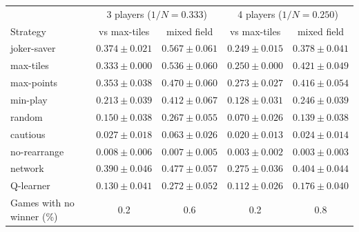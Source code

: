 \begin{tabular}{@{}lcccc@{}}\toprule
 & \multicolumn{2}{c}{3 players ($1/N=0.333$)} & \multicolumn{2}{c}{4 players ($1/N=0.250$)}\\
Strategy & vs max-tiles & mixed field & vs max-tiles & mixed field\\\midrule
joker-saver & $0.374\pm0.021$ & $0.567\pm0.061$ & $0.249\pm0.015$ & $0.378\pm0.041$ \\
max-tiles & $0.333\pm0.000$ & $0.536\pm0.060$ & $0.250\pm0.000$ & $0.421\pm0.049$ \\
max-points & $0.353\pm0.038$ & $0.470\pm0.060$ & $0.273\pm0.027$ & $0.416\pm0.054$ \\
min-play & $0.213\pm0.039$ & $0.412\pm0.067$ & $0.128\pm0.031$ & $0.246\pm0.039$ \\
random & $0.150\pm0.038$ & $0.267\pm0.055$ & $0.070\pm0.026$ & $0.139\pm0.038$ \\
cautious & $0.027\pm0.018$ & $0.063\pm0.026$ & $0.020\pm0.013$ & $0.024\pm0.014$ \\
no-rearrange & $0.008\pm0.006$ & $0.007\pm0.005$ & $0.003\pm0.002$ & $0.003\pm0.003$ \\
\midrule
network & $0.390\pm0.046$ & $0.477\pm0.057$ & $0.275\pm0.036$ & $0.404\pm0.044$ \\
Q-learner & $0.130\pm0.041$ & $0.272\pm0.052$ & $0.112\pm0.026$ & $0.176\pm0.040$ \\
\midrule
Games with no winner (\%) & 0.2 & 0.6 & 0.2 & 0.8 \\
\bottomrule\end{tabular}
